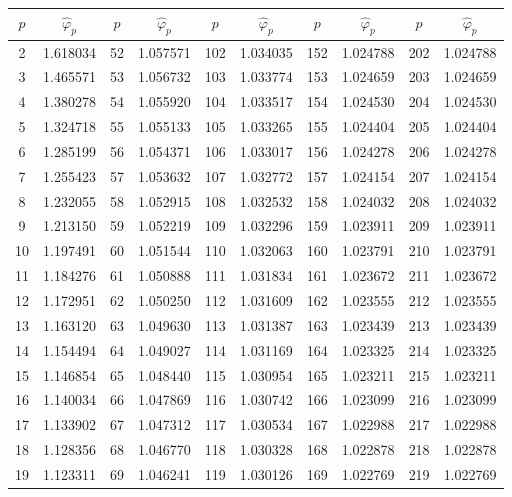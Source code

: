 \documentclass{article}
\begin{document}
    \begin{table}
      \centering
      \begin{tabular}{*{10}{c}}
        \toprule
        $p$ & $\hat{\varphi}_p$ & $p$ & $\hat{\varphi}_p$ & $p$ & $\hat{\varphi}_p$ & $p$ & $\hat{\varphi}_p$ & $p$ & $\hat{\varphi}_p$ \\
        \midrule
        2 & 1.618034 & 52 & 1.057571 & 102 & 1.034035 & 152 & 1.024788 & 202 & 1.024788 \\
        3 & 1.465571 & 53 & 1.056732 & 103 & 1.033774 & 153 & 1.024659 & 203 & 1.024659 \\
        4 & 1.380278 & 54 & 1.055920 & 104 & 1.033517 & 154 & 1.024530 & 204 & 1.024530 \\
        5 & 1.324718 & 55 & 1.055133 & 105 & 1.033265 & 155 & 1.024404 & 205 & 1.024404 \\
        6 & 1.285199 & 56 & 1.054371 & 106 & 1.033017 & 156 & 1.024278 & 206 & 1.024278 \\
        7 & 1.255423 & 57 & 1.053632 & 107 & 1.032772 & 157 & 1.024154 & 207 & 1.024154 \\
        8 & 1.232055 & 58 & 1.052915 & 108 & 1.032532 & 158 & 1.024032 & 208 & 1.024032 \\
        9 & 1.213150 & 59 & 1.052219 & 109 & 1.032296 & 159 & 1.023911 & 209 & 1.023911 \\
        10 & 1.197491 & 60 & 1.051544 & 110 & 1.032063 & 160 & 1.023791 & 210 & 1.023791 \\
        11 & 1.184276 & 61 & 1.050888 & 111 & 1.031834 & 161 & 1.023672 & 211 & 1.023672 \\
        12 & 1.172951 & 62 & 1.050250 & 112 & 1.031609 & 162 & 1.023555 & 212 & 1.023555 \\
        13 & 1.163120 & 63 & 1.049630 & 113 & 1.031387 & 163 & 1.023439 & 213 & 1.023439 \\
        14 & 1.154494 & 64 & 1.049027 & 114 & 1.031169 & 164 & 1.023325 & 214 & 1.023325 \\
        15 & 1.146854 & 65 & 1.048440 & 115 & 1.030954 & 165 & 1.023211 & 215 & 1.023211 \\
        16 & 1.140034 & 66 & 1.047869 & 116 & 1.030742 & 166 & 1.023099 & 216 & 1.023099 \\
        17 & 1.133902 & 67 & 1.047312 & 117 & 1.030534 & 167 & 1.022988 & 217 & 1.022988 \\
        18 & 1.128356 & 68 & 1.046770 & 118 & 1.030328 & 168 & 1.022878 & 218 & 1.022878 \\
        19 & 1.123311 & 69 & 1.046241 & 119 & 1.030126 & 169 & 1.022769 & 219 & 1.022769 \\

\end{tabular}
\end{table}
\end{document}
